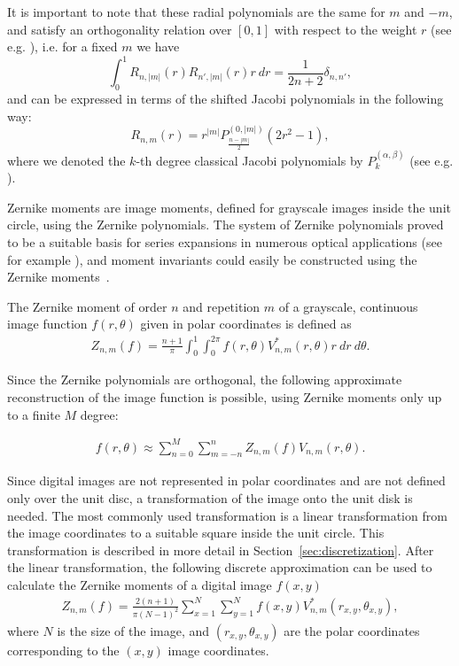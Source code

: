 It is important to note that these radial polynomials are the same for $m$ and $-m$, and satisfy an orthogonality relation over $[0,1]$ with respect to the weight $r$ (see e.g. \cite{schipp}), i.e. for a fixed $m$ we have
\begin{equation}\label{Rortho}
	\int_0^1 R_{n,|m|}(r) R_{n',|m|}(r)r\ dr  = \frac{1}{2n+2} \delta_{n,n'},
\end{equation}
and can be expressed in terms of the shifted Jacobi polynomials in the following way:
\begin{equation}\label{RJacobi}
	R_{n,m}(r) = r^{|m|} P_{\frac{n - |m|}{2}}^{(0,|m|)}(2r^2-1),
\end{equation}
where we denoted the $k$-th degree classical Jacobi polynomials by $P_k^{(\alpha,\beta)}$ (see e.g. \cite{Szego}).


Zernike moments are image moments, defined for grayscale images inside the unit circle, using the Zernike polynomials.
The system of Zernike polynomials proved to be a suitable basis for series expansions in numerous optical applications (see for example %
), and moment invariants could easily be constructed using the Zernike moments~\cite{zernike_moments}. 

The Zernike moment of order $n$ and repetition $m$ of a grayscale, continuous image function $f(r,\theta)$ given in polar coordinates is defined as
\begin{gather*}
  Z_{n,m}(f) = \frac{n + 1}{\pi}\int_0^1\int_0^{2\pi}f(r,\theta)V_{n,m}^{*}(r,\theta)r\ dr\ d\theta.
\end{gather*}

Since the Zernike polynomials are orthogonal, the following approximate reconstruction of the image function is possible, using Zernike moments only up to a finite $M$ degree:

\begin{gather*}
  f(r,\theta) \approx \sum_{n=0}^{M}\sum_{m=-n}^{n}Z_{n,m}(f)V_{n,m}(r,\theta).
\end{gather*}

Since digital images are not represented in polar coordinates and are not defined only over the unit disc, a transformation of the image onto the unit disk is needed. The most commonly used transformation is a linear transformation from the image coordinates to a suitable square inside the unit circle. This transformation is described in more detail in Section~\ref{sec:discretization}.
After the linear transformation, the following discrete approximation can be used to calculate the Zernike moments of a digital image $f(x,y)$
\begin{gather*}
  Z_{n,m}(f) = \frac{2(n+1)}{\pi(N-1)^2}\sum_{x=1}^{N}\sum_{y=1}^{N}f(x,y)V_{n,m}^{*}(r_{x,y},\theta_{x,y}),
\end{gather*}
where $N$ is the size of the image, and $(r_{x,y},\theta_{x,y})$ are the polar coordinates corresponding to the $(x,y)$ image coordinates.

